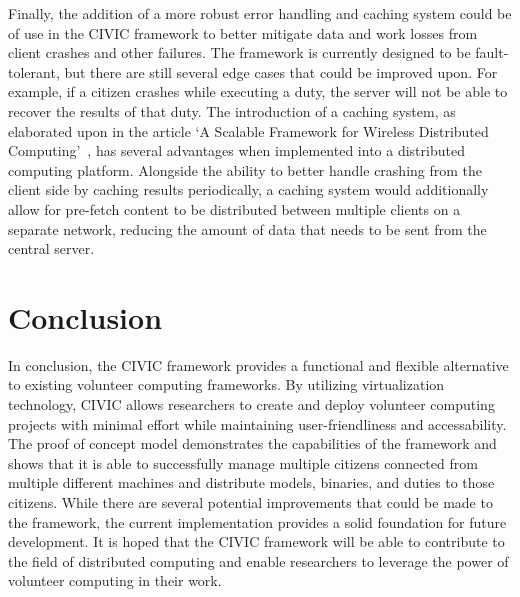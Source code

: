 \documentclass[11pt]{article}
\begin{document}
Finally, the addition of a more robust error handling and caching system could be of use in the CIVIC framework to better mitigate data and work losses from client crashes and other failures. The framework is currently designed to be fault-tolerant, but there are still several edge cases that could be improved upon. For example, if a citizen crashes while executing a duty, the server will not be able to recover the results of that duty. The introduction of a caching system, as elaborated upon in the article `A Scalable Framework for Wireless Distributed Computing'~\cite{Li2017}, has several advantages when implemented into a distributed computing platform. Alongside the ability to better handle crashing from the client side by caching results periodically, a caching system would additionally allow for pre-fetch content to be distributed between multiple clients on a separate network, reducing the amount of data that needs to be sent from the central server.

\section{Conclusion}

In conclusion, the CIVIC framework provides a functional and flexible alternative to existing volunteer computing frameworks. By utilizing virtualization technology, CIVIC allows researchers to create and deploy volunteer computing projects with minimal effort while maintaining user-friendliness and accessability. The proof of concept model demonstrates the capabilities of the framework and shows that it is able to successfully manage multiple citizens connected from multiple different machines and distribute models, binaries, and duties to those citizens. While there are several potential improvements that could be made to the framework, the current implementation provides a solid foundation for future development. It is hoped that the CIVIC framework will be able to contribute to the field of distributed computing and enable researchers to leverage the power of volunteer computing in their work.


\newpage
\thispagestyle{empty}
\nocite{*} %
\renewcommand{\refname}{Bibliography} %

 
\end{document}
